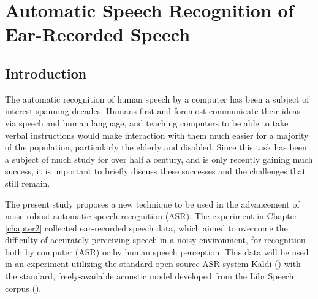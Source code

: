 % 
% 
% 

\chapter{Automatic Speech Recognition of Ear-Recorded Speech\label{chapter4}}


\section{Introduction}\label{chap4:introduction}

The automatic recognition of human speech by a computer has been a subject of interest spanning decades.  Humans first and foremost communicate their ideas via speech and human language, and teaching computers to be able to take verbal instructions would make interaction with them much easier for a majority of the population, particularly the elderly and disabled.  Since this task has been a subject of much study for over half a century, and is only recently gaining much success, it is important to briefly discuss these successes and the challenges that still remain.

The present study proposes a new technique to be used in the advancement of noise-robust automatic speech recognition (ASR).
The experiment in Chapter \ref{chapter2} collected ear-recorded speech data, which aimed to overcome the difficulty of accurately perceiving speech in a noisy environment, for recognition both by computer (ASR) or by human speech perception.  This data will be used in an experiment utilizing the standard open-source ASR system Kaldi (\cite{povey:11}) with the standard, freely-available acoustic model developed from the LibriSpeech corpus (\cite{panayotov:15}).

